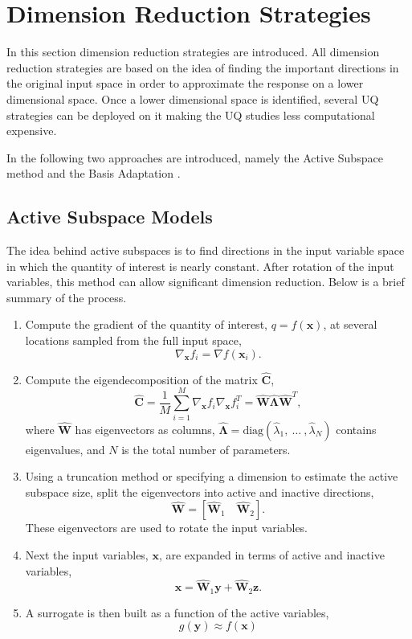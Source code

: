 \chapter{Dimension Reduction Strategies}\label{Chap:DimRed}

In this section dimension reduction strategies are introduced. All dimension reduction strategies are based on the idea of finding the important directions in the original input space
in order to approximate the response on a lower dimensional space. Once a lower dimensional space is identified, several UQ strategies can be deployed on it making the UQ studies less computational expensive.

In the following two approaches are introduced, namely the Active Subspace method \cite{constantine2015active} and the Basis Adaptation \cite{Tip14}.

\section{Active Subspace Models}\label{Chap:ActSub}
The idea behind active subspaces is to find directions in the input variable
space in which the quantity of interest is nearly constant. After rotation of
the input variables, this method can allow significant dimension reduction. Below is a brief summary of the process.
\begin{enumerate}
\item Compute the gradient of the quantity of interest, $q = f(\mathbf{x})$,
    at several locations sampled from the full input space,
    $$\nabla_{\mathbf{x}} f_i = \nabla f(\mathbf{x}_i).$$

\item Compute the eigendecomposition of the matrix $\hat{\mathbf{C}}$,
    $$\hat{\mathbf{C}} = \frac{1}{M}\sum_{i=1}^{M}\nabla_{\mathbf{x}} f_i\nabla_{\mathbf{x}} f_i^T = \hat{\mathbf{W}}\hat{\mathbf{\Lambda}}\hat{\mathbf{W}}^T,$$
    where $\hat{\mathbf{W}}$ has eigenvectors as columns, 
    $\hat{\mathbf{\Lambda}} = \text{diag}(\hat{\lambda}_1,\:\ldots\:,\hat{\lambda}_N)$
    contains eigenvalues, and $N$ is the total number of parameters.

\item Using a truncation method or specifying a
    dimension to estimate the active subspace size, 
    split the eigenvectors into active and inactive directions,
    $$\hat{\mathbf{W}} = \left[\hat{\mathbf{W}}_1\quad\hat{\mathbf{W}}_2\right].$$
    These eigenvectors are used to rotate the input variables.

\item Next the input variables, $\mathbf{x}$, are expanded in terms of active and
    inactive variables,
    $$\mathbf{x} = \hat{\mathbf{W}}_1\mathbf{y} + \hat{\mathbf{W}}_2\mathbf{z}.$$

\item A surrogate is then built as a function of the active variables,
    $$g(\mathbf{y}) \approx f(\mathbf{x})$$
\end{enumerate}

